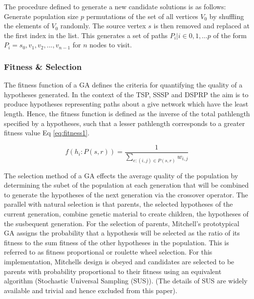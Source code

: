 \documentclass[
	a4paper, %
	10pt, %
	unnumberedsections, %
	twoside, %
]{LTJournalArticle}
\begin{document}
The procedure defined to generate a new candidate solutions is as follows: Generate population size \(p\) permutations of the set of all vertices \(V_{0}\) by shuffling the elements of \(V_{0}\) randomly. The source vertex \(s\) is then removed and replaced at the first index in the list. This generates a set of paths \({P_{i} | i \in {0, 1, ... p}}\) of the form \(P_{i} = {s_{0}, v_{1}, v_{2}, ..., v_{n-1}}\) for \(n\) nodes to visit. \\

\subsubsection{Fitness \& Selection} 
The fitness function of a GA defines the criteria for quantifying the quality of a hypotheses generated. In the context of the TSP, SSSP and DSPRP the aim is to produce hypotheses representing paths about a give network which have the least length. Hence, the fitness function is defined as the inverse of the total pathlength specified by a hypotheses, such that a lesser pathlength corresponds to a greater fitness value Eq \ref{eq:fitness1}. 

\begin{equation}
	f(h_{i}: P(s, r)) = \frac{1}{\sum_{e: (i, j) \in P(s, r)} w_{i, j}}
	\label{eq:fitness1}
\end{equation}

The selection method of a GA effects the average quality of the population by determining the subet of the population at each generation that will be combined to generate the hypotheses of the next generation via the crossover operator. The parallel with natural selection is that parents, the selected hypotheses of the current generation, combine genetic material to create children, the hypotheses of the susbequent generation. For the selection of parents, Mitchell's prototypical GA assigns the probability that a hypothesis will be selected as the ratio of its fitness to the sum fitness of the other hypotheses in the population. This is referred to as fitness proportional or roulette wheel selection. For this implementation, Mitchells design is obeyed and candidates are selected to be parents with probability proportional to their fitness using an equivalent algorithm (Stochastic Universal Sampling (SUS)). (The details of SUS are widely available and trivial and hence excluded from this paper). 
\end{document}
